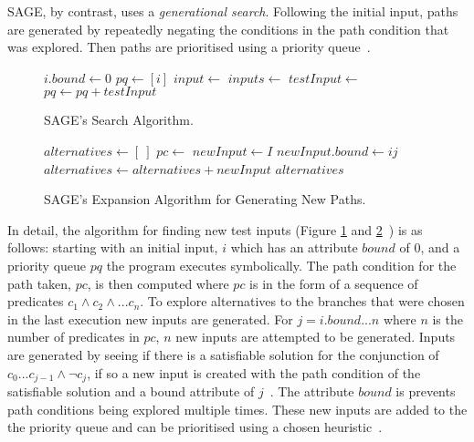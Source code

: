 \documentclass[]{final_report}
\begin{document}
SAGE, by contrast, uses a \textit{generational search}. Following the initial input, paths are generated by repeatedly negating the conditions in the path condition that was explored. Then paths are prioritised using a priority queue~\cite{godefroid2005dart}.

\begin{figure}[t]
\begin{algorithmic}
	\State $i.bound \gets 0$
	\State $pq \gets [i]$
	\State{}
		\State $input \gets$ 
		\State $inputs \gets$ 
			\State $testInput \gets$ 
			\State {}
			\State $pq \gets pq + testInput$
		\EndWhile
	\EndWhile
\EndFunction    
\end{algorithmic}
\caption{\label{fig:sage-search} SAGE's Search Algorithm.}
\end{figure}

\begin{figure}[t]
\begin{algorithmic}
	\State $alternatives \gets [\ ]$
	\State $pc \gets$ 
			\State $newInput \gets I$
			\State $newInput.bound \gets ij$
			\State $alternatives \gets alternatives + newInput$
		\EndIf
	\EndFor
	\State \Return $alternatives$
\EndFunction    
\end{algorithmic}
\caption{\label{fig:sage-compute-new-children} SAGE's Expansion Algorithm for Generating New Paths.}
\end{figure}


In detail, the algorithm for finding new test inputs (Figure \ref{fig:sage-search} and \ref{fig:sage-compute-new-children}~\cite{godefroid2008automated}) is as follows: starting with an initial input, $i$ which has an attribute $bound$ of 0, and a priority queue $pq$ the program executes symbolically. The path condition for the path taken, $pc$, is then computed where $pc$ is in the form of a sequence of predicates $c_1 \land c_2 \land ... c_n $. To explore alternatives to the branches that were chosen in the last execution new inputs are generated. For $j = i.bound ... n$ where $n$ is the number of predicates in $pc$, $n$ new inputs are attempted to be generated. Inputs are generated by seeing if there is a satisfiable solution for the conjunction of $c_0...c_{j-1} \land \lnot{c_j}$, if so a new input is created with the path condition of the satisfiable solution and a bound attribute of $j$~\cite{godefroid2005dart, godefroid2008grammar}. The attribute $bound$ is prevents path conditions being explored multiple times. These new inputs are added to the the priority queue and can be prioritised using a chosen heuristic~\cite{cadar2013symbolic}.
\end{document}
